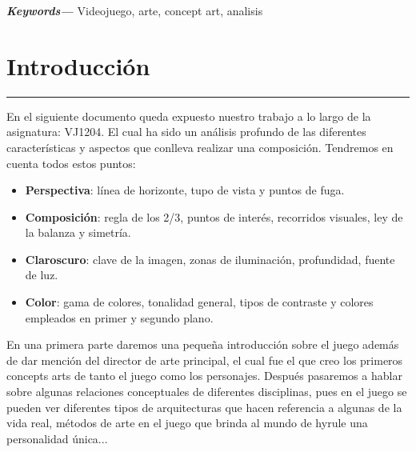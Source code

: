 \documentclass[12pt]{article}
\providecommand{\keywords}[1]
{
  \small
  \textbf{\textit{Keywords---}} #1
}
\begin{document}
\keywords{Videojuego, arte, concept art, analisis}

\newpage
\tableofcontents
\setcounter{tocdepth}{4}

\newpage
\newpage
\renewcommand{\listfigurename}{Lita de figuras}
\thispagestyle{empty}
\listoffigures


\newpage
\section{Introducción}
    \hrule
\vspace{1cm}
    En el siguiente documento queda expuesto nuestro trabajo a lo largo de la asignatura: VJ1204. El cual ha sido un análisis profundo de las diferentes características y aspectos que conlleva realizar una composición. Tendremos en cuenta todos estos puntos:
    \begin{itemize}
        \item \textbf{Perspectiva}: línea de horizonte, tupo de vista y puntos de fuga.
        \item \textbf{Composición}: regla de los 2/3, puntos de interés, recorridos visuales, ley de la balanza y simetría.
        \item \textbf{Claroscuro}: clave de la imagen, zonas de iluminación, profundidad, fuente de luz.
        \item \textbf{Color}: gama de colores, tonalidad general, tipos de contraste y colores empleados en primer y segundo plano.
    \end{itemize}

    En una primera parte daremos una pequeña introducción sobre el juego además de dar mención del director de arte principal, el cual fue el que creo los primeros concepts arts de tanto el juego como los personajes. Después pasaremos a hablar sobre algunas relaciones conceptuales de diferentes disciplinas, pues en el juego se pueden ver diferentes tipos de arquitecturas que hacen referencia a algunas de la vida real, métodos de arte en el juego que brinda al mundo de hyrule una personalidad única...
\end{document}
